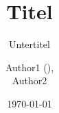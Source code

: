 \title{Titel}
\subtitle{Untertitel}
\author{Author1 (), \\ Author2}
\date{\today{}}
\newcommand{\abgabetermin}{07.06.2024}
\newcommand{\labdate}{24.05.2024}